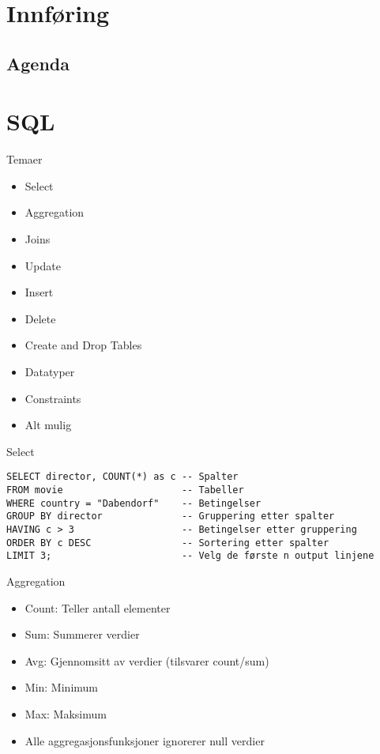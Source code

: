 
\begin{frame}[t,plain]
    \titlepage
\end{frame}

\section{Innføring}
\subsection*{Agenda}
\begin{frame}
    \tableofcontents
\end{frame}

\section{SQL}
\begin{frame}{Temaer}
\begin{itemize}
    \item Select
    \item Aggregation
    \item Joins
    \item Update
    \item Insert
    \item Delete
    \item Create and Drop Tables
    \item Datatyper
    \item Constraints
    \item Alt mulig
\end{itemize}
\end{frame}

\begin{frame}[fragile]{Select}
\begin{verbatim}
SELECT director, COUNT(*) as c -- Spalter
FROM movie                     -- Tabeller
WHERE country = "Dabendorf"    -- Betingelser
GROUP BY director              -- Gruppering etter spalter
HAVING c > 3                   -- Betingelser etter gruppering
ORDER BY c DESC                -- Sortering etter spalter 
LIMIT 3;                       -- Velg de første n output linjene
\end{verbatim}
\end{frame}

\begin{frame}[fragile]{Aggregation}
\begin{itemize}
    \item Count: Teller antall elementer
    \item Sum: Summerer verdier
    \item Avg: Gjennomsitt av verdier (tilsvarer count/sum)
    \item Min: Minimum
    \item Max: Maksimum
    \item Alle aggregasjonsfunksjoner ignorerer null verdier
\end{itemize}
\end{frame}

